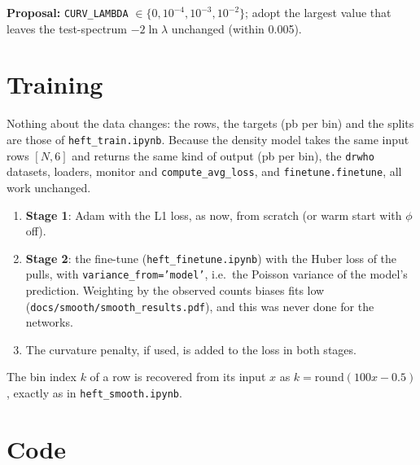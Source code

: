 \documentclass[11pt]{article}
\newcommand{\file}[1]{\nolinkurl{#1}}
\newcommand{\code}[1]{\texttt{#1}}
\begin{document}
\textbf{Proposal:} \code{CURV\_LAMBDA} $\in \{0, 10^{-4}, 10^{-3}, 10^{-2}\}$; adopt the largest
value that leaves the test-spectrum $-2\ln\lambda$ unchanged (within 0.005).

\section{Training}
\label{sec:training}

Nothing about the data changes: the rows, the targets (pb per bin) and the splits are those of
\file{heft_train.ipynb}. Because the density model takes the same input rows $[N, 6]$ and returns
the same kind of output (pb per bin), the \code{drwho} datasets, loaders, monitor and
\code{compute\_avg\_loss}, and \code{finetune.finetune}, all work unchanged.

\begin{enumerate}
  \item \textbf{Stage 1}: Adam with the L1 loss, as now, from scratch (or warm start with $\phi$ off).
  \item \textbf{Stage 2}: the fine-tune (\file{heft_finetune.ipynb}) with the Huber loss of the pulls,
    with \code{variance\_from='model'}, i.e.\ the Poisson variance of the model's prediction.
    Weighting by the observed counts biases fits low (\file{docs/smooth/smooth_results.pdf}),
    and this was never done for the networks.
  \item The curvature penalty, if used, is added to the loss in both stages.
\end{enumerate}
The bin index $k$ of a row is recovered from its input $x$ as $k = \mathrm{round}(100x - 0.5)$,
exactly as in \file{heft_smooth.ipynb}.

\section{Code}
\label{sec:code}
\end{document}
